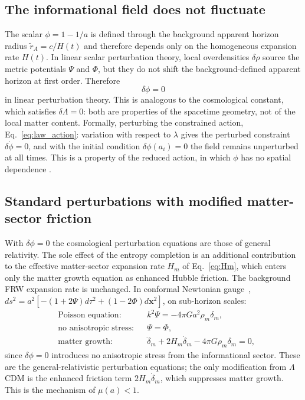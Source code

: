 \subsection{The informational field does not fluctuate}
The scalar $\phi=1-1/a$ is defined through the background apparent horizon radius $\tilde r_A=c/H(t)$ and therefore depends only on the homogeneous
expansion rate $H(t)$. In linear scalar perturbation theory, local overdensities $\delta\rho$ source the metric potentials $\Psi$ and $\Phi$, but they do not
shift the background-defined apparent horizon at first order. Therefore
\begin{equation}
\delta\phi=0 \label{eq:law_dphi}
\end{equation}
in linear perturbation theory. This is analogous to the cosmological constant, which satisfies $\delta\Lambda=0$: both are properties of the spacetime
geometry, not of the local matter content. Formally, perturbing the constrained action, Eq.~\eqref{eq:law_action}: variation with respect to $\lambda$ gives
the perturbed constraint $\delta\dot\phi=0$, and with the initial condition $\delta\phi(a_i)=0$ the field remains unperturbed at all times. This is a
property of the reduced action, in which $\phi$ has no spatial dependence \conjecture.

\subsection{Standard perturbations with modified matter-sector friction}
With $\delta\phi=0$ the cosmological perturbation equations are those of general relativity. The sole effect of the entropy completion is an additional
contribution to the effective matter-sector expansion rate $H_m$ of Eq.~\eqref{eq:Hm}, which enters only the matter growth equation as enhanced Hubble
friction. The background FRW expansion rate is unchanged. In conformal Newtonian gauge~\cite{MaBertschinger1995},
$ds^2=a^2[-(1+2\Psi)d\tau^2+(1-2\Phi)d\mathbf x^2]$, on sub-horizon scales:
\begin{align}
&\text{Poisson equation:} && k^2\Psi=-4\pi Ga^2\rho_m\delta_m, \label{eq:law_poisson}\\
&\text{no anisotropic stress:} && \Psi=\Phi, \label{eq:law_noaniso}\\
&\text{matter growth:} && \ddot\delta_m+2H_m\dot\delta_m-4\pi G\rho_m\delta_m=0, \label{eq:law_growth}
\end{align}
since $\delta\phi=0$ introduces no anisotropic stress from the informational sector. These are the general-relativistic perturbation equations; the only
modification from $\Lambda$CDM is the enhanced friction term $2H_m\dot\delta_m$, which suppresses matter growth. This is the mechanism of $\mu(a)<1$. \derived{}

